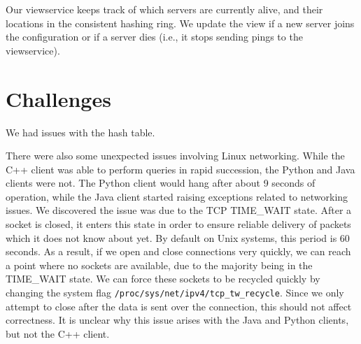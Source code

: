 \documentclass[letterpaper,11pt]{article}
\begin{document}
     Our viewservice keeps track of which servers are currently alive, and their locations in the consistent hashing ring.
     We update the view if a new server joins the configuration or if a server dies (i.e., it stops sending pings to the viewservice).

     \section{Challenges}
     We had issues with the hash table.

     There were also some unexpected issues involving Linux networking.
     While the C++ client was able to perform queries in rapid succession, the Python and Java clients were not.
     The Python client would hang after about 9 seconds of operation, while the Java client started raising exceptions related to networking issues.
     We discovered the issue was due to the TCP TIME\_WAIT state.
     After a socket is closed, it enters this state in order to ensure reliable delivery of packets which it does not know about yet.
     By default on Unix systems, this period is 60 seconds.
     As a result, if we open and close connections very quickly, we can reach a point where no sockets are available, due to the majority being in the TIME\_WAIT state.
     We can force these sockets to be recycled quickly by changing the system flag \verb=/proc/sys/net/ipv4/tcp_tw_recycle=.
     Since we only attempt to close after the data is sent over the connection, this should not affect correctness.
     It is unclear why this issue arises with the Java and Python clients, but not the C++ client.




\end{document}
